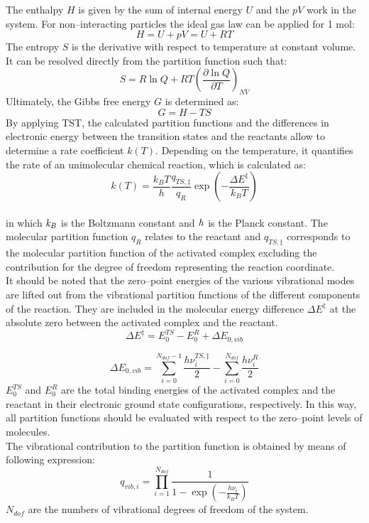 \noindent The enthalpy $H$ is given by the sum of internal energy $U$ and the
$pV$ work in the system. For non--interacting particles the ideal gas law
can be applied for 1 mol:
\[
H = U + pV = U + R T
\]
The entropy $S$ is the derivative with respect to temperature at constant
volume.
It can be resolved directly from the partition function such that:
\[
S = R \ln Q + R T \left(\frac{\partial \ln Q}{\partial
T}\right)_{NV}
\]
Ultimately, the Gibbs free energy $G$ is determined as:
\[
G = H - TS
\]
By applying TST, the calculated partition functions and the differences in
electronic energy between the transition states and the reactants allow to
determine a rate coefficient $k(T)$. Depending on the temperature, it quantifies
the rate of an unimolecular chemical reaction, which is calculated as:
\[
k(T) = \frac{{k_B T}}
{h}\frac{{q_{TS,\ddagger}}}{{q_R}} \exp\left(- \frac{\Delta E^{\ddagger}}{k_B
T}\right)
\]
\\
\noindent
in which $\it{k}_{B}$ is the Boltzmann constant and $\it{h}$ is the Planck
constant. The molecular partition function $q_R$ relates to the reactant and
$q_{TS,\ddagger}$ corresponds to the molecular partition function of the
activated complex excluding the contribution for the degree of freedom
representing the reaction coordinate.\\
It should be noted that the zero--point energies of the various vibrational
modes are lifted out from the vibrational partition functions of the different
components of the reaction. They are included in the molecular energy difference 
$\Delta E^{\ddagger}$ at the absolute zero between the activated
complex and the reactant. 
\[
\Delta E^{\ddagger} = E_{0}^{TS} - E_{0}^{R} + \Delta E_{0,vib}
\]
 
\[
\Delta E_{0,vib} = \sum_{i=0}^{N_{dof}-1} \frac{h \nu_{i}^{TS,\ddagger}}{2}
- \sum_{i=0}^{N_{dof}} \frac{h \nu_{i}^{R}}{2}
\]
\noindent
$E_{0}^{TS}$ and $E_{0}^{R}$ are the total binding energies of the activated
complex and the reactant in their electronic ground state configurations,
respectively. In this way, all partition functions should be evaluated with
respect to the zero--point levels of molecules.\\
\noindent
The vibrational contribution to the partition function is obtained by means of
following expression:
\[
q_{vib,i} = \prod_{i=1}^{N_{dof}} \frac{1}{1 - \exp\left(- \frac{h
\nu_{i}}{k_B T}\right)}
\]
\noindent
$N_{dof}$ are the numbers of vibrational degrees of freedom of the system.

\newpage
